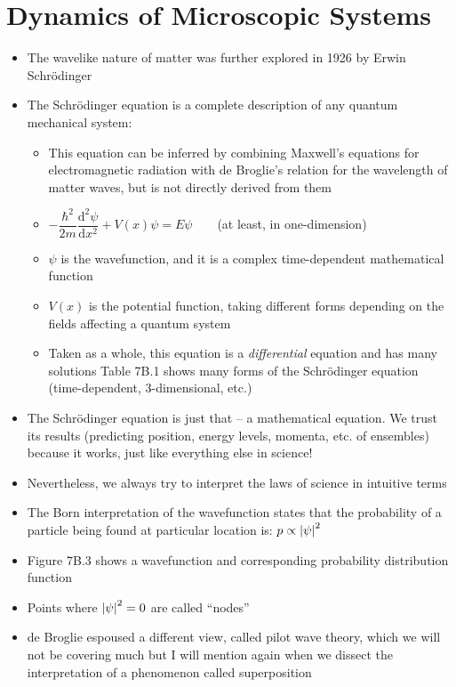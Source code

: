 \documentclass[12pt, openany, letterpaper]{memoir}
\begin{document}
\section{Dynamics of Microscopic Systems}
\begin{itemize}
	\item The wavelike nature of matter was further explored in 1926 by Erwin Schr\"odinger
	\item The Schr\"odinger equation is a complete description of any quantum mechanical system:
	\begin{itemize}
		\item This equation can be inferred by combining Maxwell's equations for electromagnetic radiation with de Broglie's relation for the wavelength of matter waves, but is not directly derived from them
		\item $-\dfrac{\hbar^2}{2m}\dfrac{\mathrm{d}^2\psi}{\mathrm{d}x^2} + V(x)\psi=E\psi$ ~ ~ (at least, in one-dimension)
		\item $\psi$ is the wavefunction, and it is a complex time-dependent mathematical function
		\item $V(x)$ is the potential function, taking different forms depending on the fields affecting a quantum system
		\item Taken as a whole, this equation is a \emph{differential} equation and has many solutions
		Table 7B.1 shows many forms of the Schr\"odinger equation (time-dependent, 3-dimensional, etc.)
	\end{itemize}
	\item The Schr\"odinger equation is just that -- a mathematical equation. We trust its results (predicting position, energy levels, momenta, etc. of ensembles) because it works, just like everything else in science!
	\item Nevertheless, we always try to interpret the laws of science in intuitive terms
	\item The Born interpretation of the wavefunction states that the probability of a particle being found at particular location is: $p\propto\left| \psi \right|^2$
	\item Figure 7B.3 shows a wavefunction and corresponding probability distribution function
	\item Points where $\left| \psi \right|^2=0$ are called “nodes”
	\item de Broglie espoused a different view, called pilot wave theory, which we will not be covering much but I will mention again when we dissect the interpretation of a phenomenon called superposition

\end{itemize}
\end{document}
